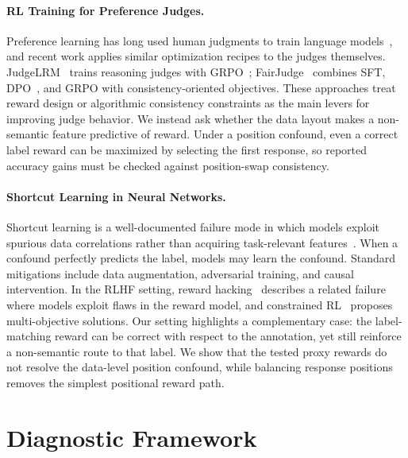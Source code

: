 \documentclass[letterpaper]{article}
\begin{document}
\paragraph{RL Training for Preference Judges.}
Preference learning has long used human judgments to train language models~\citep{christiano2017deep,stiennon2020learning,ouyang2022training,bai2022training}, and recent work applies similar optimization recipes to the judges themselves. JudgeLRM~\citep{chen2025judgelrm} trains reasoning judges with GRPO~\citep{shao2024deepseekmath}; FairJudge~\citep{fairjudge2026} combines SFT, DPO~\citep{rafailov2023direct}, and GRPO with consistency-oriented objectives. These approaches treat reward design or algorithmic consistency constraints as the main levers for improving judge behavior. We instead ask whether the data layout makes a non-semantic feature predictive of reward. Under a position confound, even a correct label reward can be maximized by selecting the first response, so reported accuracy gains must be checked against position-swap consistency.

\paragraph{Shortcut Learning in Neural Networks.}
Shortcut learning is a well-documented failure mode in which models exploit spurious data correlations rather than acquiring task-relevant features~\citep{geirhos2020shortcut,mccoy2019right,tu2020empirical}. When a confound perfectly predicts the label, models may learn the confound. Standard mitigations include data augmentation, adversarial training, and causal intervention. In the RLHF setting, reward hacking~\citep{skalse2022defining,gao2023scaling,pan2024spontaneous} describes a related failure where models exploit flaws in the reward model, and constrained RL~\citep{moskovitz2024confronting} proposes multi-objective solutions. Our setting highlights a complementary case: the label-matching reward can be correct with respect to the annotation, yet still reinforce a non-semantic route to that label. We show that the tested proxy rewards do not resolve the data-level position confound, while balancing response positions removes the simplest positional reward path.

\section{Diagnostic Framework}
\end{document}
